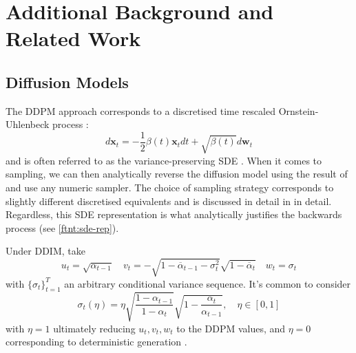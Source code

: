 \section{Additional Background and Related Work} \label{sec:extra}

\subsection{Diffusion Models}

\begin{remark} \label{rem:sde-rep}
    The DDPM approach corresponds to a discretised time rescaled Ornstein-Uhlenbeck process
    \parencite{boysTweedieMomentProjected2023,songScoreBasedGenerativeModeling2021}:
    $$
    d\mathbf{x}_t = -\frac{1}{2}\beta(t)\mathbf{x}_t dt + \sqrt{\beta(t)}d\mathbf{w}_t
    $$
    and is often referred to as the variance-preserving SDE
    \parencite{songScoreBasedGenerativeModeling2021}. When it comes to sampling, we can then
    analytically reverse the diffusion model using the result of
    \textcite{andersonReversetimeDiffusionEquation1982} and use any numeric sampler. The choice
    of sampling strategy corresponds to slightly different discretised equivalents and is discussed
    in detail in \textcite{songScoreBasedGenerativeModeling2021} in detail.
    Regardless, this SDE representation is what analytically justifies the backwards process
    (see \autoref{ftnt:sde-rep}).
\end{remark}

\begin{remark} \label{rem:ddim}
    Under DDIM, take
    \begin{equation*}
        u_t = \sqrt{\alpha_{t-1}} \quad
        v_t = -\sqrt{1 - \overline{\alpha}_{t-1} - \sigma_t^2}\sqrt{1 - \overline{\alpha}_t} \quad
        w_t = \sigma_t
    \end{equation*}
    with $\{\sigma_t\}_{t=1}^T$ an arbitrary conditional variance sequence. It's common to consider
    \begin{equation*}
        \sigma_t(\eta) = \eta\sqrt{\frac{1 - \alpha_{t-1}}{1 - \alpha_t}}\sqrt{1 - \frac{\alpha_t}{\alpha_{t-1}}},\quad \eta \in [0,1]
    \end{equation*}
    with $\eta=1$ ultimately reducing $u_t, v_t, w_t$ to the DDPM values, and $\eta=0$ corresponding
    to deterministic generation \parencite{songDenoisingDiffusionImplicit2020}.
\end{remark}

